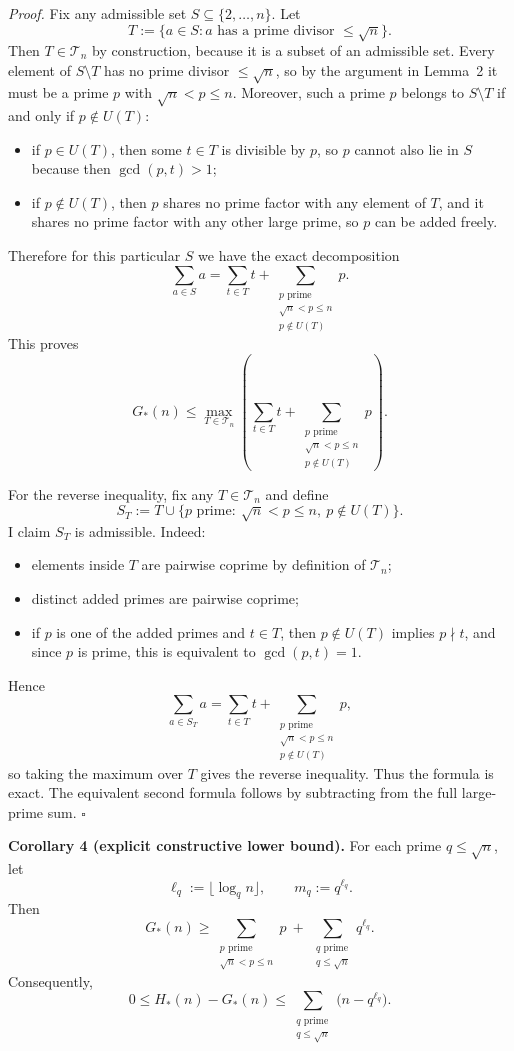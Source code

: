 \noindent\emph{Proof.}
Fix any admissible set $S\subseteq\{2,\dots,n\}$.
Let
\[
T:=\{a\in S:\text{$a$ has a prime divisor }\le \sqrt n\}.
\]
Then $T\in\mathcal T_n$ by construction, because it is a subset of an admissible set.
Every element of $S\setminus T$ has no prime divisor $\le \sqrt n$, so by the argument in Lemma~2 it must be a prime $p$ with $\sqrt n<p\le n$.
Moreover, such a prime $p$ belongs to $S\setminus T$ if and only if $p\notin U(T)$:
\begin{itemize}
\item if $p\in U(T)$, then some $t\in T$ is divisible by $p$, so $p$ cannot also lie in $S$ because then $\gcd(p,t)>1$;
\item if $p\notin U(T)$, then $p$ shares no prime factor with any element of $T$, and it shares no prime factor with any other large prime, so $p$ can be added freely.
\end{itemize}
Therefore for this particular $S$ we have the exact decomposition
\[
\sum_{a\in S}a=\sum_{t\in T}t+\sum_{\substack{p\text{ prime}\\ \sqrt n<p\le n\\ p\notin U(T)}}p.
\]
This proves
\[
G_*(n)\le \max_{T\in\mathcal T_n}\left(\sum_{t\in T}t+\sum_{\substack{p\text{ prime}\\ \sqrt n<p\le n\\ p\notin U(T)}}p\right).
\]

For the reverse inequality, fix any $T\in\mathcal T_n$ and define
\[
S_T:=T\cup \{p\text{ prime}:\ \sqrt n<p\le n,\ p\notin U(T)\}.
\]
I claim $S_T$ is admissible.
Indeed:
\begin{itemize}
\item elements inside $T$ are pairwise coprime by definition of $\mathcal T_n$;
\item distinct added primes are pairwise coprime;
\item if $p$ is one of the added primes and $t\in T$, then $p\notin U(T)$ implies $p\nmid t$, and since $p$ is prime, this is equivalent to $\gcd(p,t)=1$.
\end{itemize}
Hence
\[
\sum_{a\in S_T}a=\sum_{t\in T}t+\sum_{\substack{p\text{ prime}\\ \sqrt n<p\le n\\ p\notin U(T)}}p,
\]
so taking the maximum over $T$ gives the reverse inequality.
Thus the formula is exact.
The equivalent second formula follows by subtracting from the full large-prime sum.
\hfill$\square$

\medskip
\noindent\textbf{Corollary 4 (explicit constructive lower bound).}
For each prime $q\le \sqrt n$, let
\[
\ell_q:=\lfloor \log_q n\rfloor,
\qquad
m_q:=q^{\ell_q}.
\]
Then
\[
G_*(n)\ge \sum_{\substack{p\text{ prime}\\ \sqrt n<p\le n}}p\ +\ \sum_{\substack{q\text{ prime}\\ q\le \sqrt n}} q^{\ell_q}.
\]
Consequently,
\[
0\le H_*(n)-G_*(n)\le \sum_{\substack{q\text{ prime}\\ q\le \sqrt n}}\bigl(n-q^{\ell_q}\bigr).
\]

